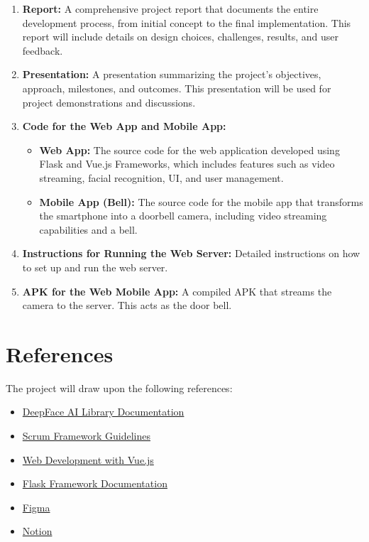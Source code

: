 \documentclass[a4 paper, 12pt]{article}
\begin{document}
\begin{enumerate}
    \item \textbf{Report:} A comprehensive project report that documents the entire development process, from initial concept to the final implementation. This report will include details on design choices, challenges, results, and user feedback.

    \item \textbf{Presentation:} A presentation summarizing the project's objectives, approach, milestones, and outcomes. This presentation will be used for project demonstrations and discussions.

    \item \textbf{Code for the Web App and Mobile App:}
        \begin{itemize}
            \item \textbf{Web App:} The source code for the web application developed using Flask and Vue.js Frameworks, which includes features such as video streaming, facial recognition, UI, and user management.
            \item \textbf{Mobile App (Bell):} The source code for the mobile app that transforms the smartphone into a doorbell camera, including video streaming capabilities and a bell.
        \end{itemize}

    \item \textbf{Instructions for Running the Web Server:} Detailed instructions on how to set up and run the web server.

    \item \textbf{APK for the Web Mobile App:} A compiled APK that streams the camera to the server. This acts as the door bell.
\end{enumerate}
\section{References}
The project will draw upon the following references:
\begin{itemize}

    \item \href{https://github.com/serengil/deepface}{DeepFace AI Library Documentation}
    \item \href{https://scrumguides.org/scrum-guide.html}{Scrum Framework Guidelines}
    \item \href{https://vuejs.org/guide/introduction.html}{Web Development with Vue.js}
    \item \href{https://flask.palletsprojects.com/en/3.0.x/}{Flask Framework Documentation}
    \item \href{https://www.figma.com/}{Figma}
    \item \href{https://notion.so}{Notion}
\end{itemize}
\end{document}
